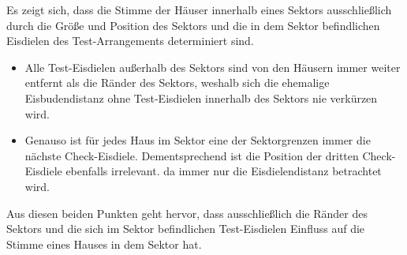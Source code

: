 \documentclass[a4paper,10pt,ngerman]{scrartcl}
\begin{document}
Es zeigt sich, dass die Stimme der Häuser innerhalb eines Sektors ausschließlich durch die Größe und Position des Sektors und die in dem Sektor befindlichen Eisdielen des Test-Arrangements determiniert sind.
\begin{itemize}
    \item Alle Test-Eisdielen außerhalb des Sektors sind von den Häusern immer weiter entfernt als die Ränder des Sektors, weshalb sich die ehemalige Eisbudendistanz ohne Test-Eisdielen innerhalb des Sektors nie verkürzen wird.
    \item Genauso ist für jedes Haus im Sektor eine der Sektorgrenzen immer die nächste Check-Eisdiele.
          Dementsprechend ist die Position der dritten Check-Eisdiele ebenfalls irrelevant. da immer nur die Eisdielendistanz betrachtet wird.
\end{itemize}
Aus diesen beiden Punkten geht hervor, dass ausschließlich die Ränder des Sektors und die sich im Sektor befindlichen Test-Eisdielen Einfluss auf die Stimme eines Hauses in dem Sektor hat.
\end{document}
